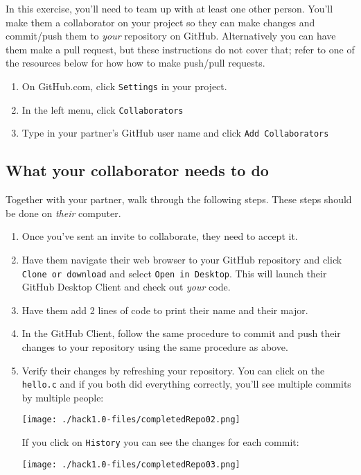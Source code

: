 \documentclass[12pt]{scrartcl}
\begin{document}
In this exercise, you'll need to team up with at least one other person.
You'll make them a collaborator on your project so they can make changes
and commit/push them to \emph{your} repository on GitHub.  Alternatively
you can have them make a pull request, but these instructions do not cover 
that; refer to one of the resources below for how how to make push/pull
requests.

\begin{enumerate}
  \item On GitHub.com, click \texttt{Settings} in your project.
  \item In the left menu, click \texttt{Collaborators}
  \item Type in your partner's GitHub user name and click \texttt{Add Collaborators}
\end{enumerate}

\subsection{What your collaborator needs to do}

Together with your partner, walk through the following steps.  These
steps should be done on \emph{their} computer.

\begin{enumerate}
  \item Once you've sent an invite to collaborate, they need to accept it.
  \item Have them navigate their web browser to your GitHub 
  repository and click \newline \texttt{Clone or download} and select
  \texttt{Open in Desktop}. This will launch their GitHub
  Desktop Client and check out \emph{your} code.
  \item Have them add 2 lines of code to print their name and their major.
  \item In the GitHub Client, follow the same procedure to commit and push
  their changes to your repository using the same procedure as above.
  \item Verify their changes by refreshing your repository.  You can click
  on the \texttt{hello.c} and if you both did everything correctly, 
  you'll see multiple commits by multiple people:
  \begin{center}
  \texttt{[image: ./hack1.0-files/completedRepo02.png]}
  \end{center}
  If you click on \texttt{History} you can see the changes for
  each commit: 
  \begin{center}
  \texttt{[image: ./hack1.0-files/completedRepo03.png]}
  \end{center}

\end{enumerate}
\end{document}
